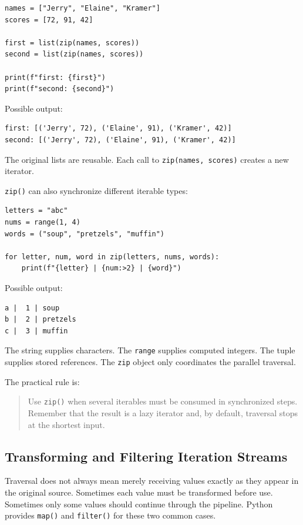 \documentclass[a4paper,twoside]{report}
\begin{document}
\begin{verbatim}
names = ["Jerry", "Elaine", "Kramer"]
scores = [72, 91, 42]

first = list(zip(names, scores))
second = list(zip(names, scores))

print(f"first: {first}")
print(f"second: {second}")
\end{verbatim}

Possible output:

\begin{verbatim}
first: [('Jerry', 72), ('Elaine', 91), ('Kramer', 42)]
second: [('Jerry', 72), ('Elaine', 91), ('Kramer', 42)]
\end{verbatim}

The original lists are reusable. Each call to \texttt{zip(names, scores)} creates a new iterator.

\texttt{zip()} can also synchronize different iterable types:

\begin{verbatim}
letters = "abc"
nums = range(1, 4)
words = ("soup", "pretzels", "muffin")

for letter, num, word in zip(letters, nums, words):
    print(f"{letter} | {num:>2} | {word}")
\end{verbatim}

Possible output:

\begin{verbatim}
a |  1 | soup
b |  2 | pretzels
c |  3 | muffin
\end{verbatim}

The string supplies characters. The \texttt{range} supplies computed integers. The tuple supplies stored references. The \texttt{zip} object only coordinates the parallel traversal.

The practical rule is:

\begin{quote}
Use \texttt{zip()} when several iterables must be consumed in synchronized steps. Remember that the result is a lazy iterator and, by default, traversal stops at the shortest input.
\end{quote}

\subsection{Transforming and Filtering Iteration Streams}

Traversal does not always mean merely receiving values exactly as they appear in the original source. Sometimes each value must be transformed before use. Sometimes only some values should continue through the pipeline. Python provides \texttt{map()} and \texttt{filter()} for these two common cases.
\end{document}
